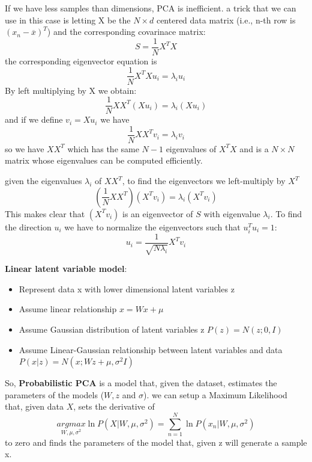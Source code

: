 If we have less samples than dimensions, PCA is inefficient. a trick that we can use in this case is letting X be the $N\times d$ centered data matrix (i.e., n-th row is $(x_{n}-\overline{x})^{T}$) and the corresponding covarinace matrix:
\begin{equation}
    S = \frac{1}{N}X^{T}X
\end{equation}
the corresponding eigenvector equation is
\begin{equation}
    \frac{1}{N}X^{T}Xu_{i} = \lambda_{i}u_{i}
\end{equation}
By left multiplying by X we obtain:
\begin{equation}
    \frac{1}{N}XX^{T}(Xu_{i}) = \lambda_{i}(Xu_{i})
\end{equation}
and if we define $v_{i} = Xu_{i}$ we have
\begin{equation}
    \frac{1}{N}XX^{T}v_{i} = \lambda_{i}v_{i}
\end{equation}
so we have $XX^{T}$ which has the same $N - 1$ eigenvalues of $X^{T}X$ and is a $N\times N$ matrix whose eigenvalues can be computed efficiently.

given the eigenvalues $\lambda_{i}$ of $XX^{T}$, to find the eigenvectors we left-multiply by $X^{T}$
\begin{equation}
    \left(\frac{1}{N}XX^{T}\right)\left(X^{T}v_{i}\right) = \lambda_{i}\left(X^{T}v_{i}\right)
\end{equation}
This makes clear that $\left(X^{T}v_{i}\right)$ is an eigenvector of $S$ with eigenvalue $\lambda_{i}$. To find the direction $u_{i}$ we have to normalize the eigenvectors such that $u_{i}^{T}u_{i} = 1$:
\begin{equation}
    u_{i} = \frac{1}{\sqrt{N\lambda_{i}}} X^{T}v_{i}
\end{equation}

\textbf{Linear latent variable model}:
\begin{itemize}
    \item Represent data x with lower dimensional latent variables z
    \item Assume linear relationship $x = Wx + \mu$
    \item Assume Gaussian distribution of latent variables z $P(z) = N(z; 0, I)$
    \item Assume Linear-Gaussian relationship between latent variables and data $P(x|z) = N(x;Wz + \mu, \sigma^{2}I)$    
\end{itemize}
So, \textbf{Probabilistic PCA} is a model that, given the dataset, estimates the parameters of the models ($W, z$ and $\sigma$). we can setup a Maximum Likelihood that, given data $X$, sets the derivative of 
\begin{equation}
    \underset{W, \mu, \sigma^{2}}{argmax} \ln P(X|W, \mu, \sigma^{2}) = \sum_{n=1}^{N} \ln P(x_{n}|W, \mu, \sigma^{2})
\end{equation}
 to zero and finds the parameters of the model that, given z will generate a sample x.

